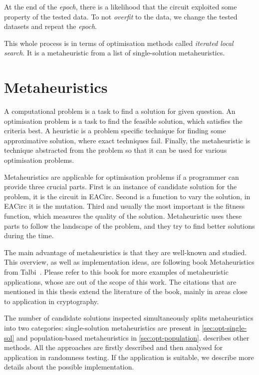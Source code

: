 \documentclass[
  print, %
  Table,   %
  nolof,     %
  nolot,     %
  11pt, %
  oneside  %
]{fithesis3}
\begin{document}
At the end of the \textit{epoch}, there is a likelihood that the circuit exploited some property of the tested data. To not \textit{overfit} to the data, we change the tested datasets and repeat the \textit{epoch}.

This whole process is in terms of optimisation methods called \textit{iterated local search}. It is a metaheuristic from a list of single-solution metaheuristics.


\chapter{Metaheuristics}
\label{chap:metaheuristics}

A computational problem is a task to find a solution for given question. An optimisation problem is a task to find the feasible solution, which satisfies the criteria best. A heuristic is a problem specific technique for finding some approximative solution, where exact techniques fail. Finally, the metaheuristic is technique abstracted from the problem so that it can be used for various optimisation problems.

Metaheuristics are applicable for optimisation problems if a programmer can provide three crucial parts. First is an instance of candidate solution for the problem, it is the circuit in EACirc. Second is a function to vary the solution, in EACirc it is the mutation. Third and usually the most important is the fitness function, which measures the quality of the solution. Metaheuristic uses these parts to follow the landscape of the problem, and they try to find better solutions during the time.

The main advantage of metaheuristics is that they are well-known and studied. This overview, as well as implementation ideas, are following book Metaheuristics from Talbi~\cite{talbi2009metaheuristics}. Please refer to this book for more examples of metaheuristic applications, whose are out of the scope of this work. The citations that are mentioned in this thesis extend the literature of the book, mainly in areas close to application in cryptography.

The number of candidate solutions inspected simultaneously splits metaheuristics into two categories: single-solution metaheuristics are present in \cref{sec:opt-single-sol} and population-based metaheuristics in \cref{sec:opt-population}.  describes other methods. All the approaches are firstly described and then analysed for application in randomness testing. If the application is suitable, we describe more details about the possible implementation.
\end{document}
